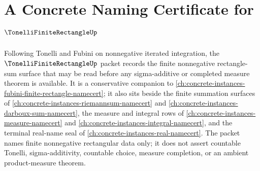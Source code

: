 \chapter{A Concrete Naming Certificate for $\TonelliFiniteRectangleUp$}
\label{ch:concrete-instances-tonelli-finite-rectangle-namecert}

Following Tonelli and Fubini on nonnegative iterated integration, the $\TonelliFiniteRectangleUp$ packet records the finite nonnegative rectangle-sum surface that may be read before any sigma-additive or completed measure theorem is available. It is a conservative companion to \autoref{ch:concrete-instances-fubini-finite-rectangle-namecert}; it also sits beside the finite summation surfaces of \autoref{ch:concrete-instances-riemannsum-namecert} and \autoref{ch:concrete-instances-darboux-sum-namecert}, the measure and integral rows of \autoref{ch:concrete-instances-measure-namecert} and \autoref{ch:concrete-instances-integral-namecert}, and the terminal real-name seal of \autoref{ch:concrete-instances-real-namecert}. The packet names finite nonnegative rectangular data only; it does not assert countable Tonelli, sigma-additivity, countable choice, measure completion, or an ambient product-measure theorem.

